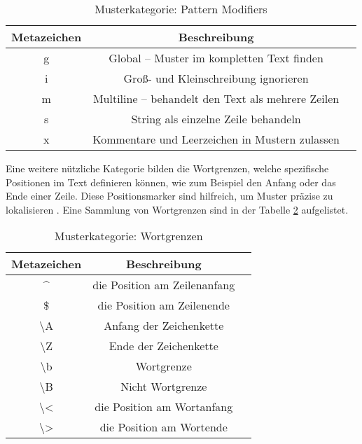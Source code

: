 \begin{table}[H]
\centering
\begin{tabular}{|c|c|p{8cm}|}
\hline
\textbf{Metazeichen} & \textbf{Beschreibung} \\ 
\hline
g  & Global – Muster im kompletten Text finden \\ 
\hline
i  & Groß- und Kleinschreibung ignorieren \\ 
\hline
m  & Multiline – behandelt den Text als mehrere Zeilen  \\ 
\hline
s  & String als einzelne Zeile behandeln  \\ 
\hline
x  & Kommentare und Leerzeichen in Mustern zulassen  \\ 
\hline
\end{tabular}
\caption{Musterkategorie: Pattern Modifiers}
\label{tab:Meta_Pattern_Modifiers}
\end{table}

Eine weitere nützliche Kategorie bilden die Wortgrenzen, welche spezifische Positionen im Text definieren können, wie zum Beispiel den Anfang oder das Ende einer Zeile. Diese Positionsmarker sind hilfreich, um Muster präzise zu lokalisieren \cite[S.94]{friedl2009regulare}. Eine Sammlung von Wortgrenzen sind in der Tabelle \ref{tab:Meta_Wortgrenzen} aufgelistet.

\begin{table}[H]
\centering
\begin{tabular}{|c|c|p{8cm}|}
\hline
\textbf{Metazeichen} & \textbf{Beschreibung} \\ 
\hline
\^{}  & die Position am Zeilenanfang \\ 
\hline
\$  & die Position am Zeilenende \\ 
\hline
\textbackslash A  & Anfang der Zeichenkette  \\ 
\hline
\textbackslash Z  & Ende der Zeichenkette  \\ 
\hline
\textbackslash b  & Wortgrenze  \\ 
\hline
\textbackslash B  & Nicht Wortgrenze  \\ 
\hline
\textbackslash <  & die Position am Wortanfang  \\ 
\hline
\textbackslash >  & die Position am Wortende  \\ 
\hline
\end{tabular}
\caption{Musterkategorie: Wortgrenzen}
\label{tab:Meta_Wortgrenzen}
\end{table}

